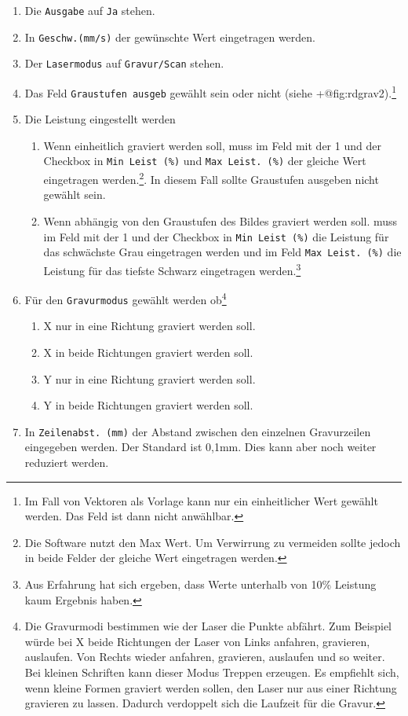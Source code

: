 \documentclass[]{article}
\providecommand{\tightlist}{%
  \setlength{\itemsep}{0pt}\setlength{\parskip}{0pt}}
\begin{document}
\begin{enumerate}
\def\labelenumi{\arabic{enumi}.}
\tightlist
\item
  Die \texttt{Ausgabe} auf \texttt{Ja} stehen.
\item
  In \texttt{Geschw.(mm/s)} der gewünschte Wert eingetragen werden.
\item
  Der \texttt{Lasermodus} auf \texttt{Gravur/Scan} stehen.
\item
  Das Feld \texttt{Graustufen\ ausgeb} gewählt sein oder nicht (siehe
  +@fig:rdgrav2).\footnote{Im Fall von Vektoren als Vorlage kann nur ein
    einheitlicher Wert gewählt werden. Das Feld ist dann nicht
    anwählbar.}
\item
  Die Leistung eingestellt werden

  \begin{enumerate}
  \def\labelenumii{\arabic{enumii}.}
  \tightlist
  \item
    Wenn einheitlich graviert werden soll, muss im Feld mit der 1 und
    der Checkbox in \texttt{Min\ Leist\ (\%)} und
    \texttt{Max\ Leist.\ (\%)} der gleiche Wert eingetragen
    werden.\footnote{Die Software nutzt den Max Wert. Um Verwirrung zu
      vermeiden sollte jedoch in beide Felder der gleiche Wert
      eingetragen werden.}. In diesem Fall sollte Graustufen ausgeben
    nicht gewählt sein.
  \item
    Wenn abhängig von den Graustufen des Bildes graviert werden soll.
    muss im Feld mit der 1 und der Checkbox in \texttt{Min\ Leist\ (\%)}
    die Leistung für das schwächste Grau eingetragen werden und im Feld
    \texttt{Max\ Leist.\ (\%)} die Leistung für das tiefste Schwarz
    eingetragen werden.\footnote{Aus Erfahrung hat sich ergeben, dass
      Werte unterhalb von 10\% Leistung kaum Ergebnis haben.}
  \end{enumerate}
\item
  Für den \texttt{Gravurmodus} gewählt werden ob\footnote{Die Gravurmodi
    bestimmen wie der Laser die Punkte abfährt. Zum Beispiel würde bei X
    beide Richtungen der Laser von Links anfahren, gravieren, auslaufen.
    Von Rechts wieder anfahren, gravieren, auslaufen und so weiter. Bei
    kleinen Schriften kann dieser Modus Treppen erzeugen. Es empfiehlt
    sich, wenn kleine Formen graviert werden sollen, den Laser nur aus
    einer Richtung gravieren zu lassen. Dadurch verdoppelt sich die
    Laufzeit für die Gravur.}

  \begin{enumerate}
  \def\labelenumii{\arabic{enumii}.}
  \tightlist
  \item
    X nur in eine Richtung graviert werden soll.
  \item
    X in beide Richtungen graviert werden soll.
  \item
    Y nur in eine Richtung graviert werden soll.
  \item
    Y in beide Richtungen graviert werden soll.
  \end{enumerate}
\item
  In \texttt{Zeilenabst.\ (mm)} der Abstand zwischen den einzelnen
  Gravurzeilen eingegeben werden. Der Standard ist 0,1mm. Dies kann aber
  noch weiter reduziert werden.
\end{enumerate}
\end{document}
